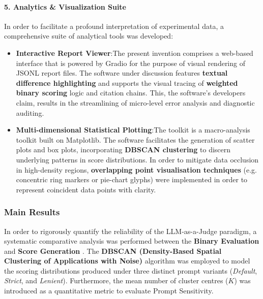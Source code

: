 \paragraph{5. Analytics \& Visualization Suite}
In order to facilitate a profound interpretation of experimental data, a comprehensive suite of analytical tools was developed:
\begin{itemize}
\item \textbf{Interactive Report Viewer}:The present invention comprises a web-based interface that is powered by Gradio for the purpose of visual rendering of JSONL report files. The software under discussion features \textbf{textual difference highlighting} and supports the visual tracing of \textbf{weighted binary scoring} logic and citation chains. This, the software's developers claim, results in the streamlining of micro-level error analysis and diagnostic auditing.
\item \textbf{Multi-dimensional Statistical Plotting}:The toolkit is a macro-analysis toolkit built on Matplotlib. The software facilitates the generation of scatter plots and box plots, incorporating \textbf{DBSCAN clustering} to discern underlying patterns in score distributions. In order to mitigate data occlusion in high-density regions, \textbf{overlapping point visualisation techniques} (e.g. concentric ring markers or pie-chart glyphs) were implemented in order to represent coincident data points with clarity.
\end{itemize}

\subsubsection{Main Results}

\begin{placeholderblock}
[这里需要插入多张布局后的图片]
\end{placeholderblock}

In order to rigorously quantify the reliability of the LLM-as-a-Judge paradigm, a systematic comparative analysis was performed between the \textbf{Binary Evaluation} and \textbf{Score Generation} . The \textbf{DBSCAN (Density-Based Spatial Clustering of Applications with Noise)} algorithm was employed to model the scoring distributions produced under three distinct prompt variants (\textit{Default}, \textit{Strict}, and \textit{Lenient}). Furthermore, the mean number of cluster centres ($K$) was introduced as a quantitative metric to evaluate Prompt Sensitivity.


